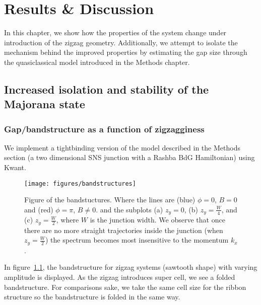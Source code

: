 \chapter{Results \& Discussion}
		In this chapter, we show how the properties of the system change under introduction of the zigzag geometry.
		Additionally, we attempt to isolate the mechanism behind the improved properties by estimating the gap size through the quasiclassical model introduced in the Methods chapter.
		
	\section{Increased isolation and stability of the Majorana state}

		\subsection{Gap/bandstructure as a function of zigzagginess}
			We implement a tightbinding version of the model described in the Methods section (a two dimensional SNS junction with a Rashba BdG Hamiltonian) using Kwant.

			\begin{figure}[!htb]
			\centering
			\texttt{[image: figures/bandstructures]}
			\caption{Figure of the bandstuctures.
			Where the lines are (blue) $\phi=0$, $B=0$ and (red) $\phi=\pi$, $B \ne 0$.
			and the subplots (a) $z_y=0$, (b) $z_y=\frac{W}{4}$, and (c) $z_y=\frac{W}{2}$, where $W$ is the junction width.
			We observe that once there are no more straight trajectories inside the junction (when $z_y=\frac{W}{2}$) the spectrum becomes most insensitive to the momentum $k_x$.
			\label{fig:bandstuctures}}
			\end{figure}

			In figure~\ref{fig:bandstuctures}, the bandstructure for zigzag systems (sawtooth shape) with varying amplitude is displayed.
			As the zigzag introduces super cell, we see a folded bandstructure.
			For comparisons sake, we take the same cell size for the ribbon structure so the bandstructure is folded in the same way.

